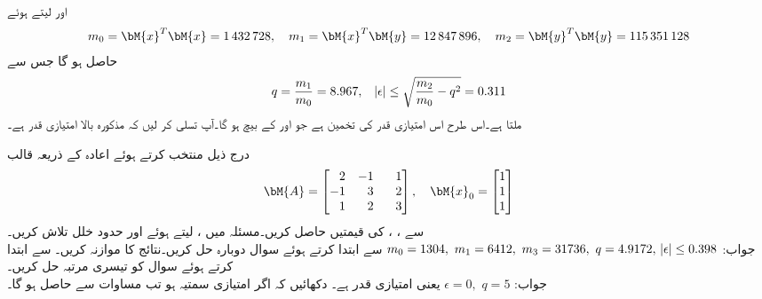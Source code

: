  اور  لیتے ہوئے
\begin{align*}
m_0=\bM{x}^T\bM{x}=\num{1432728}, \quad m_1=\bM{x}^T\bM{y}=\num{12847896}, \quad m_2=\bM{y}^T\bM{y}=\num{115351128}
\end{align*}
حاصل ہو گا جس سے
\begin{align*}
q=\frac{m_1}{m_0}=8.967,\quad \abs{\epsilon}\le \sqrt{\frac{m_2}{m_0}-q^2}=0.311
\end{align*}
ملتا ہے۔اس طرح  اس امتیازی قدر کی تخمین ہے جو  اور  کے بیچ ہو گا۔آپ تسلی کر لیں کہ مذکورہ بالا  امتیازی قدر  ہے۔ 


\quad
درج ذیل  منتخب کرتے ہوئے اعادہ کے ذریعہ  قالب 
\begin{align*}
\bM{A}=\begin{bmatrix*}[r]2&-1&\phantom{-}1\\-1&3&2\\1&2&3  \end{bmatrix*},\quad \bM{x}_0=\begin{bmatrix} 1\\1\\1 \end{bmatrix}
\end{align*}
سے ، ،  کی قیمتیں حاصل کریں۔مسئلہ  میں ،  لیتے ہوئے  اور حدود خلل  تلاش کریں۔\\
جواب:\quad
$m_0=1304,\,\, m_1=6412,\,\, m_3=31736,\,\, q=4.9172,\,\, \abs{\epsilon}\le 0.398$
\quad
{} سے ابتدا کرتے ہوئے سوال  دوبارہ حل کریں۔نتائج کا موازنہ کریں۔ 
\quad
{} سے ابتدا کرتے ہوئے سوال  کو تیسری مرتبہ حل کریں۔\\
جواب:\quad
$\epsilon=0,\,\,q=5$
یعنی  امتیازی قدر ہے۔
\quad
دکھائیں کہ اگر  امتیازی سمتیہ ہو تب مساوات  سے  حاصل ہو گا۔
\quad
